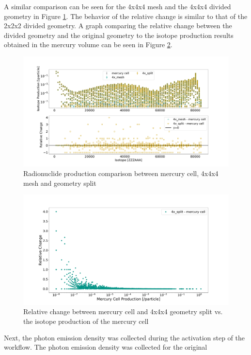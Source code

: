 A similar comparison can be seen for the 4x4x4 mesh and the 4x4x4 divided
geometry in Figure \ref{fig:1prod_cell_4x}. The behavior of the relative change
is similar to that of the 2x2x2 divided geometry. A graph comparing the relative
change between the divided geometry and the original geometry to the isotope
production results obtained in the mercury volume can be seen in Figure
\ref{fig:1prod_cell_4x_rc}.
%
\begin{figure}[H]
	\centering
	\includegraphics[scale=0.4,trim={2cm 1cm 3cm 2cm},clip]{../figs/toy_p1/prod_VPI_4x.pdf}
	\caption{Radionuclide production comparison between mercury cell, 4x4x4 mesh and geometry split}
	\label{fig:1prod_cell_4x}
\end{figure}
%
\begin{figure}[H]
 \centering
 \includegraphics[scale=0.35,trim={3cm 0.5cm 4.5cm 3cm},clip]{../figs/toy_p1/prod_VPI_rc_4x_split.pdf}
 \caption{Relative change between mercury cell and 4x4x4 geometry split vs. the isotope production of the mercury cell}
 \label{fig:1prod_cell_4x_rc}
\end{figure}
%
Next, the photon emission density was collected during the activation step of
the workflow. The photon emission density was collected for the original
